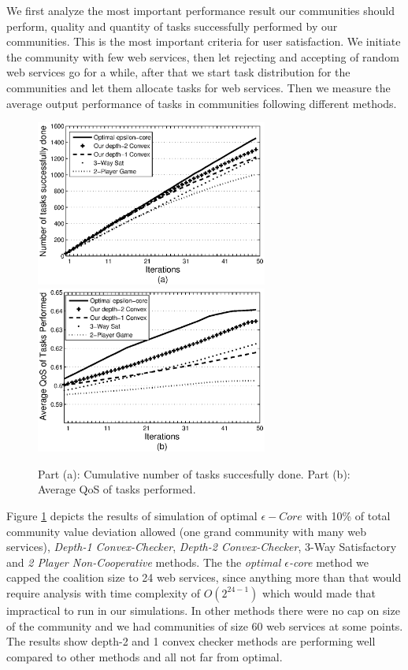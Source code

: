 \documentclass[10pt, conference, compsocconf]{IEEEtran}
\theoremstyle{plain}
\theoremstyle{definition}
\begin{document}
We first analyze the most important performance result our communities should perform, quality and quantity of tasks successfully performed by our communities. This is the most important criteria for user satisfaction. We initiate the community with few web services, then let rejecting and accepting of random web services go for a while, after that we start task distribution for the communities and let them allocate tasks for web services. Then we measure the average output performance of tasks in communities following different methods. 

\begin{figure}[!t]
\centering
\includegraphics[width=3in]{task_done_opt.eps}
\includegraphics[width=3in]{task_qos_opt.eps}
\caption{Part (a): Cumulative number of tasks succesfully done. Part
(b): Average QoS of tasks performed.} \label{performanceall}
\end{figure}

Figure \ref{performanceall} depicts the results of simulation of optimal $\epsilon-Core$ with 10\% of total community value deviation allowed (one grand community with many web services), \emph{Depth-1 Convex-Checker}, \emph{Depth-2 Convex-Checker}, 3-Way Satisfactory\cite{DBLP:conf/IEEEscc/LimTMB12} and \emph{2 Player Non-Cooperative} methods. The the \emph{optimal $\epsilon$-core} method we capped the coalition size to 24 web services, since anything more than that would require analysis with time complexity of $O(2^{24-1})$ which would made that impractical to run in our simulations. In other methods there were no cap on size of the community and we had communities of size 60 web services at some points. The results show depth-2 and 1 convex checker methods are performing well compared to other methods and all not far from optimal.
\end{document}
